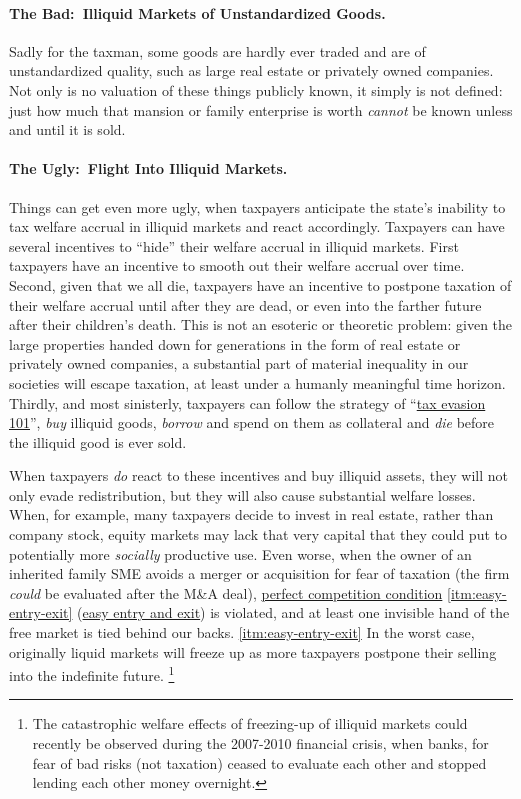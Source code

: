 \paragraph{The Bad:~Illiquid Markets of Unstandardized Goods.}
Sadly for the taxman, some goods are hardly ever traded and are of unstandardized quality, such as large real estate or privately owned companies.
Not only is no valuation of these things publicly known, it simply is not defined:
just how much that mansion or family enterprise is worth \emph{cannot} be known unless and until it is sold.

\paragraph{The Ugly:\ Flight Into Illiquid Markets.}
	\label{sec:flight-2-illiquid}
Things can get even more ugly, when taxpayers anticipate the state's inability to tax welfare accrual in illiquid markets and react accordingly.
Taxpayers can have several incentives to ``hide'' their welfare accrual in illiquid markets.
First
taxpayers have an incentive to smooth out their welfare accrual over time.
Second, given that we all die, taxpayers have an incentive to postpone taxation of their welfare accrual until after they are dead, or even into the farther future after their children's death.
This is not an esoteric or theoretic problem:
given the large properties handed down for generations in the form of real estate or privately owned companies, a substantial part of material inequality in our societies will escape taxation, at least under a humanly meaningful time horizon.
Thirdly, and most sinisterly, taxpayers can follow the strategy of ``\href{sec:Evasion101}{tax evasion 101}'', \emph{buy} illiquid goods, \emph{borrow} and spend on them as collateral and \emph{die} before the illiquid good is ever sold.

When taxpayers \emph{do} react to these incentives and buy illiquid assets, they will not only evade redistribution, but they will also cause substantial welfare losses.
When, for example, many taxpayers decide to invest in real estate, rather than company stock, equity markets may lack that very capital that they could put to potentially more \emph{socially} productive use.
Even worse, when the owner of an inherited family SME avoids a merger or acquisition for fear of taxation (the firm \emph{could} be evaluated after the M\&A deal), \href{sec:perfect-competition}{perfect competition condition} \autoref{itm:easy-entry-exit} (\hyperref[itm:easy-entry-exit]{easy entry and exit}) is violated, and at least one invisible hand of the free market is tied behind our backs. \ref{itm:easy-entry-exit}
In the worst case, originally liquid markets will freeze up as more taxpayers postpone their selling into the indefinite future.
\footnote{
	The catastrophic welfare effects of freezing-up of illiquid markets could recently be observed during the 2007-2010 financial crisis, when banks, for fear of bad risks (not taxation) ceased to evaluate each other and stopped lending each other money overnight.
}

